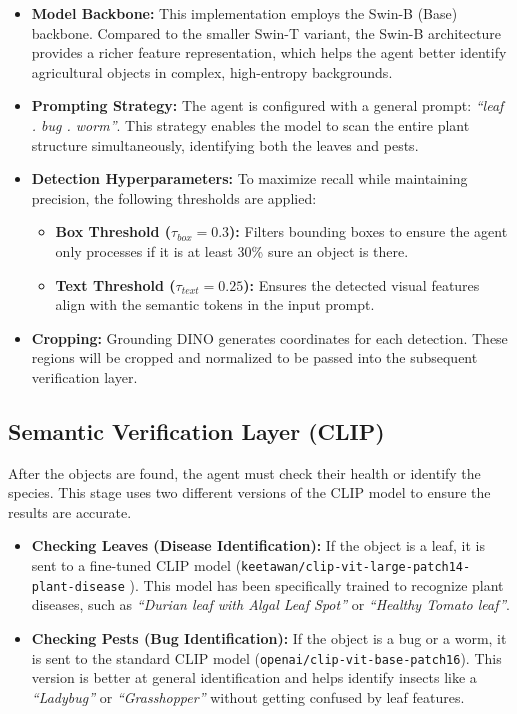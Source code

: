 \begin{itemize}
	\item \textbf{Model Backbone:} This implementation employs the Swin-B (Base) backbone. Compared to the smaller Swin-T variant, the Swin-B architecture provides a richer feature representation, which helps the agent better identify agricultural objects in complex, high-entropy backgrounds.
	\item \textbf{Prompting Strategy:} The agent is configured with a general prompt: \textit{``leaf . bug . worm''}. This strategy enables the model to scan the entire plant structure simultaneously, identifying both the leaves and pests.	
	\item \textbf{Detection Hyperparameters:} To maximize recall while maintaining precision, the following thresholds are applied:
	\begin{itemize}
		\item \textbf{Box Threshold ($\tau_{box} = 0.3$):} Filters bounding boxes to ensure the agent only processes if it is at least 30\% sure an object is there.
		\item \textbf{Text Threshold ($\tau_{text} = 0.25$):} Ensures the detected visual features align with the semantic tokens in the input prompt.
	\end{itemize}
	\item \textbf{Cropping:} Grounding DINO generates coordinates for each detection. These regions will be cropped and normalized to be passed into the subsequent verification layer.
\end{itemize}


\subsection{Semantic Verification Layer (CLIP)}
After the objects are found, the agent must check their health or identify the species. This stage uses two different versions of the CLIP model to ensure the results are accurate.

\begin{itemize}
	\item \textbf{Checking Leaves (Disease Identification):} If the object is a leaf, it is sent to a fine-tuned CLIP model (\texttt{keetawan/clip-vit-large-patch14-plant-disease} \cite{keetawan2024plantdisease}). This model has been specifically trained to recognize plant diseases, such as \textit{``Durian leaf with Algal Leaf Spot''} or \textit{``Healthy Tomato leaf''}.
	\item \textbf{Checking Pests (Bug Identification):} If the object is a bug or a worm, it is sent to the standard CLIP model (\texttt{openai/clip-vit-base-patch16}). This version is better at general identification and helps identify insects like a \textit{``Ladybug''} or \textit{``Grasshopper''} without getting confused by leaf features.
\end{itemize}

